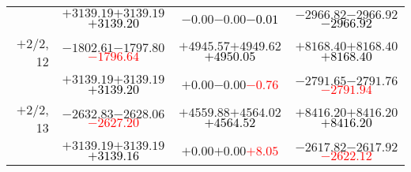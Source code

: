 \documentclass[compress]{beamer}
\begin{document}
\begin{frame}
{\begin{tabular}{r | c | c | c}
           & $+3139.19$\hspace{0.1 cm}$+3139.19$\hspace{0.1 cm}\textcolor{black}{$+3139.20$} & $-0.00$\hspace{0.1 cm}$-0.00$\hspace{0.1 cm}\textcolor{black}{$-0.01$} & $-2966.82$\hspace{0.1 cm}$-2966.92$\hspace{0.1 cm}\textcolor{black}{$-2966.92$} \\
$+$2/2, 12 & $-1802.61$\hspace{0.1 cm}$-1797.80$\hspace{0.1 cm}\textcolor{red}{$-1796.64$} & $+4945.57$\hspace{0.1 cm}$+4949.62$\hspace{0.1 cm}\textcolor{black}{$+4950.05$} & $+8168.40$\hspace{0.1 cm}$+8168.40$\hspace{0.1 cm}\textcolor{black}{$+8168.40$} \\
           & $+3139.19$\hspace{0.1 cm}$+3139.19$\hspace{0.1 cm}\textcolor{black}{$+3139.20$} & $+0.00$\hspace{0.1 cm}$-0.00$\hspace{0.1 cm}\textcolor{red}{$-0.76$} & $-2791.65$\hspace{0.1 cm}$-2791.76$\hspace{0.1 cm}\textcolor{red}{$-2791.94$} \\
$+$2/2, 13 & $-2632.83$\hspace{0.1 cm}$-2628.06$\hspace{0.1 cm}\textcolor{red}{$-2627.20$} & $+4559.88$\hspace{0.1 cm}$+4564.02$\hspace{0.1 cm}\textcolor{black}{$+4564.52$} & $+8416.20$\hspace{0.1 cm}$+8416.20$\hspace{0.1 cm}\textcolor{black}{$+8416.20$} \\
           & $+3139.19$\hspace{0.1 cm}$+3139.19$\hspace{0.1 cm}\textcolor{black}{$+3139.16$} & $+0.00$\hspace{0.1 cm}$+0.00$\hspace{0.1 cm}\textcolor{red}{$+8.05$} & $-2617.82$\hspace{0.1 cm}$-2617.92$\hspace{0.1 cm}\textcolor{red}{$-2622.12$} \\

\end{tabular}}
\end{frame}
\end{document}

